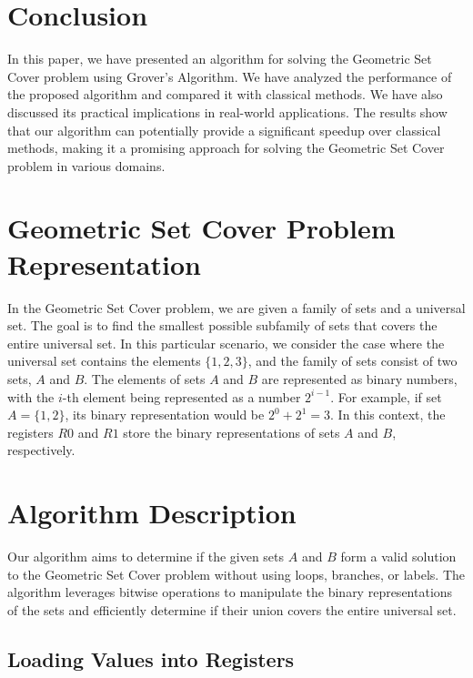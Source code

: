 \section{Conclusion}
\label{sec:conclusion}

In this paper, we have presented an algorithm for solving the Geometric Set Cover problem using Grover's Algorithm. We have analyzed the performance of the proposed algorithm and compared it with classical methods. We have also discussed its practical implications in real-world applications. The results show that our algorithm can potentially provide a significant speedup over classical methods, making it a promising approach for solving the Geometric Set Cover problem in various domains.






\section{Geometric Set Cover Problem Representation}

In the Geometric Set Cover problem, we are given a family of sets and a universal set. The goal is to find the smallest possible subfamily of sets that covers the entire universal set. In this particular scenario, we consider the case where the universal set contains the elements $\{1, 2, 3\}$, and the family of sets consist of two sets, $A$ and $B$. The elements of sets $A$ and $B$ are represented as binary numbers, with the $i$-th element being represented as a number $2^{i-1}$. For example, if set $A = \{1, 2\}$, its binary representation would be $2^0 + 2^1 = 3$. In this context, the registers $R0$ and $R1$ store the binary representations of sets $A$ and $B$, respectively.

\section{Algorithm Description}

Our algorithm aims to determine if the given sets $A$ and $B$ form a valid solution to the Geometric Set Cover problem without using loops, branches, or labels. The algorithm leverages bitwise operations to manipulate the binary representations of the sets and efficiently determine if their union covers the entire universal set.

\subsection{Loading Values into Registers}

